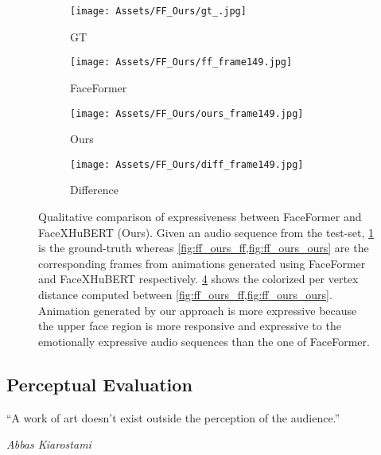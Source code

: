 \documentclass[10pt,twocolumn,letterpaper]{article}
\begin{document}
\begin{figure}[t]
  \centering
\begin{subfigure}{0.24\linewidth}
    \texttt{[image: Assets/FF\_Ours/gt\_.jpg]}
    \caption{GT}
    \label{fig:ff_ours_gt}
  \end{subfigure}
  \begin{subfigure}{0.24\linewidth}
    \texttt{[image: Assets/FF\_Ours/ff\_frame149.jpg]}
    \caption{FaceFormer}
    \label{fig:ff_ours_ff}
  \end{subfigure}
  \begin{subfigure}{0.24\linewidth}
    \texttt{[image: Assets/FF\_Ours/ours\_frame149.jpg]}
    \caption{Ours}
    \label{fig:ff_ours_ours}
  \end{subfigure}
    \begin{subfigure}{0.24\linewidth}
    \texttt{[image: Assets/FF\_Ours/diff\_frame149.jpg]}
    \caption{Difference}
    \label{fig:ff_ours_diff}
  \end{subfigure}
  \caption{Qualitative comparison of expressiveness between FaceFormer and FaceXHuBERT (Ours). Given an audio sequence from the test-set, \cref{fig:ff_ours_gt} is the ground-truth whereas \cref{fig:ff_ours_ff,fig:ff_ours_ours} are the corresponding frames from animations generated using FaceFormer and FaceXHuBERT respectively. \cref{fig:ff_ours_diff} shows the colorized per vertex distance computed between \cref{fig:ff_ours_ff,fig:ff_ours_ours}. Animation generated by our approach is more expressive because the upper face region is more responsive and expressive to the emotionally expressive audio sequences than the one of FaceFormer.}
  \label{fig:ff_ours}
  \vspace{-1em}
\end{figure}


\subsection{Perceptual Evaluation}
\label{sec:perceptual_evaluation}

\epigraph{``A work of art doesn’t exist outside the perception of the audience.''}{\textit{Abbas Kiarostami}}
\end{document}
